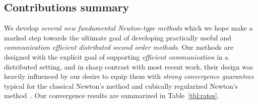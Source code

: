 \documentclass[12pt]{article}
\begin{document}
\subsection{Contributions summary}

We develop {\em several  new  fundamental Newton-type methods} which we hope make a marked step towards the ultimate goal of developing practically useful and {\em communication efficient distributed second order methods}. Our methods are designed with the explicit goal of supporting {\em efficient communication} in a distributed setting, and in sharp contrast with most recent work, their design was heavily influenced by our desire to equip them with {\em strong convergence guarantees} typical for the classical Newton's method \citep{Wallis1685, Raphson1697} and  cubically regularized Newton's method~\citep{Griewank-cubic-1981, PN2006-cubic}. Our convergence results are summarized in Table~\ref{tbl:rates}.
\end{document}
